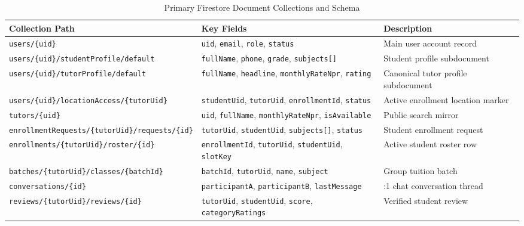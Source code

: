 \documentclass[12pt]{report}
\begin{document}
\begin{table}[H]
\centering
\caption{Primary Firestore Document Collections and Schema}
\label{tab:database_schema}
\small
\begin{tabularx}{\textwidth}{|>{\raggedright\arraybackslash}p{5cm}|>{\raggedright\arraybackslash}X|>{\raggedright\arraybackslash}p{3.5cm}|}
\hline
\textbf{Collection Path} & \textbf{Key Fields} & \textbf{Description} \\
\hline
\texttt{users/\{uid\}} & \texttt{uid}, \texttt{email}, \texttt{role}, \texttt{status} & Main user account record \\
\hline
\texttt{users/\{uid\}/}\allowbreak\texttt{studentProfile/default} & \texttt{fullName}, \texttt{phone}, \texttt{grade}, \texttt{subjects[]} & Student profile subdocument \\
\hline
\texttt{users/\{uid\}/}\allowbreak\texttt{tutorProfile/default} & \texttt{fullName}, \texttt{headline}, \texttt{monthlyRateNpr}, \texttt{rating} & Canonical tutor profile subdocument \\
\hline
\texttt{users/\{uid\}/}\allowbreak\texttt{locationAccess/}\allowbreak\texttt{\{tutorUid\}} & \texttt{studentUid}, \texttt{tutorUid}, \texttt{enrollmentId}, \texttt{status} & Active enrollment location marker \\
\hline
\texttt{tutors/\{uid\}} & \texttt{uid}, \texttt{fullName}, \texttt{monthlyRateNpr}, \texttt{isAvailable} & Public search mirror \\
\hline
\texttt{enrollmentRequests/}\allowbreak\texttt{\{tutorUid\}/}\allowbreak\texttt{requests/\{id\}} & \texttt{tutorUid}, \texttt{studentUid}, \texttt{subjects[]}, \texttt{status} & Student enrollment request \\
\hline
\texttt{enrollments/}\allowbreak\texttt{\{tutorUid\}/}\allowbreak\texttt{roster/\{id\}} & \texttt{enrollmentId}, \texttt{tutorUid}, \texttt{studentUid}, \texttt{slotKey} & Active student roster row \\
\hline
\texttt{batches/}\allowbreak\texttt{\{tutorUid\}/}\allowbreak\texttt{classes/\{batchId\}} & \texttt{batchId}, \texttt{tutorUid}, \texttt{name}, \texttt{subject} & Group tuition batch \\
\hline
\texttt{conversations/}\allowbreak\texttt{\{id\}} & \texttt{participantA}, \texttt{participantB}, \texttt{lastMessage} & 1:1 chat conversation thread \\
\hline
\texttt{reviews/}\allowbreak\texttt{\{tutorUid\}/}\allowbreak\texttt{reviews/\{id\}} & \texttt{tutorUid}, \texttt{studentUid}, \texttt{score}, \texttt{categoryRatings} & Verified student review \\
\hline
\end{tabularx}
\end{table}
\end{document}

